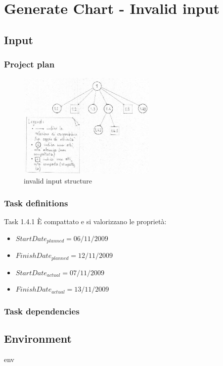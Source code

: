 \chapter{Generate Chart - Invalid input}
\label{chap:genChartInvInput}

\section{Input}
\subsection{Project plan}
\begin{figure}[h!] 
\centering
\includegraphics[width=0.6\textwidth]{case_spec/generate_Gantt/invalidInput.png}
\caption{invalid input structure}
\end{figure}

\subsection{Task definitions}
\begin{taksDef}{Task 1.4.1} \`E compattato e si valorizzano le propriet\`a:
\begin{itemize}
  \item $StartDate_{planned} = 06/11/2009$
  \item $FinishDate_{planned} = 12/11/2009$
  \item $StartDate_{actual} = 07/11/2009$
  \item $FinishDate_{actual} = 13/11/2009$
\end{itemize}
\end{taksDef}

\subsection{Task dependencies}

\section{Environment}
env

